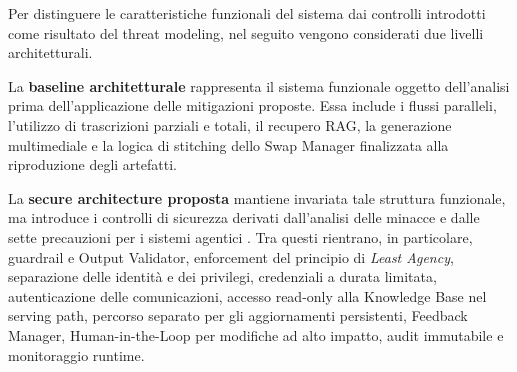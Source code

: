 \documentclass[11pt,a4paper]{article}
\begin{document}
Per distinguere le caratteristiche funzionali del sistema dai controlli
introdotti come risultato del threat modeling, nel seguito vengono
considerati due livelli architetturali.

La \textbf{baseline architetturale} rappresenta il sistema funzionale
oggetto dell'analisi prima dell'applicazione delle mitigazioni proposte.
Essa include i flussi paralleli, l'utilizzo di trascrizioni parziali e
totali, il recupero RAG, la generazione multimediale e la logica di
stitching dello Swap Manager finalizzata alla riproduzione degli artefatti.


La \textbf{secure architecture proposta} mantiene invariata tale
struttura funzionale, ma introduce i controlli di sicurezza derivati
dall'analisi delle minacce e dalle sette precauzioni per i sistemi
agentici \cite{damianiagentic}. Tra questi rientrano, in particolare,
guardrail e Output Validator, enforcement del principio di
\emph{Least Agency}, separazione delle identità e dei privilegi,
credenziali a durata limitata, autenticazione delle comunicazioni,
accesso read-only alla Knowledge Base nel serving path, percorso
separato per gli aggiornamenti persistenti, Feedback Manager,
Human-in-the-Loop per modifiche ad alto impatto, audit immutabile e
monitoraggio runtime.
\end{document}
